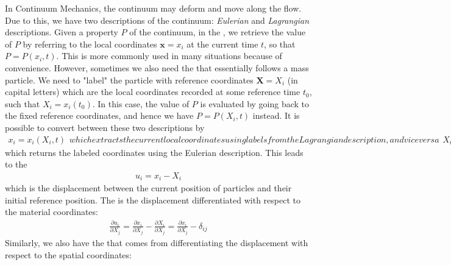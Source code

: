 In Continuum Mechanics, the continuum may deform and move along the flow. Due to this, we have two descriptions of the continuum: \textit{Eulerian} and \textit{Lagrangian} descriptions. Given a property $P$ of the continuum, in the , we retrieve the value of $P$ by referring to the local coordinates $\textbf{x} = x_i$ at the current time $t$, so that $P = P(x_i, t)$. This is more commonly used in many situations because of convenience. However, sometimes we also need the  that essentially follows a mass particle. We need to "label" the particle with reference coordinates $\textbf{X} = X_i$ (in capital letters) which are the local coordinates recorded at some reference time $t_0$, such that $X_i = x_i(t_0)$. In this case, the value of $P$ is evaluated by going back to the fixed reference coordinates, and hence we have $P = P(X_i, t)$ instead. It is possible to convert between these two descriptions by
\begin{subequations}
\begin{align}
x_i = x_i(X_i, t) \label{eqn:lagtoeuler}
\end{align}
which extracts the current local coordinates using labels from the Lagrangian description, and vice versa
\begin{align}
X_i = X_i(x_i, t)    
\end{align}
\end{subequations}
which returns the labeled coordinates using the Eulerian description. This leads to the 
\begin{align}
u_i = x_i - X_i
\end{align}
which is the displacement between the current position of particles and their initial reference position. The  is the displacement differentiated with respect to the material coordinates:
\begin{align}
\frac{\partial u_i}{\partial X_j} = \frac{\partial x_i}{\partial X_j} -  \frac{\partial X_i}{\partial X_j} = \frac{\partial x_i}{\partial X_j} - \delta_{ij}
\end{align}
Similarly, we also have the  that comes from differentiating the displacement with respect to the spatial coordinates:

